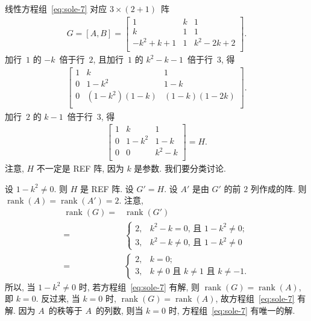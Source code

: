 \documentclass[../libro.tex]{subfiles}
\begin{document}
\begin{example}
    线性方程组~\eqref{eq:sole-7}
    对应 \(3 \times (2 + 1)\)~阵
    \begin{align*}
        G = [A, B] =
        \begin{bmatrix}
            1        & k & 1        \\
            k        & 1 & 1        \\
            -k^2+k+1 & 1 & k^2-2k+2 \\
        \end{bmatrix}.
    \end{align*}
    加行~\(1\) 的 \(-k\)~倍于行~\(2\),
    且加行~\(1\) 的 \(k^2 - k - 1\)~倍于行~\(3\),
    得
    \begin{align*}
        \begin{bmatrix}
            1 & k            & 1           \\
            0 & 1-k^2        & 1-k         \\
            0 & (1-k^2)(1-k) & (1-k)(1-2k) \\
        \end{bmatrix}.
    \end{align*}
    加行~\(2\) 的 \(k-1\)~倍于行~\(3\),
    得
    \begin{align*}
        \begin{bmatrix}
            1 & k     & 1     \\
            0 & 1-k^2 & 1-k   \\
            0 & 0     & k^2-k \\
        \end{bmatrix}
        = H.
    \end{align*}
    注意, \(H\) 不一定是 REF 阵,
    因为 \(k\) 是参数.
    我们要分类讨论.

    设 \(1 - k^2 \neq 0\).
    则 \(H\) 是 REF 阵.
    设 \(G' = H\).
    设 \(A'\) 是由 \(G'\) 的前 \(2\) 列作成的阵.
    则 \(\operatorname{rank} {(A)}
    = \operatorname{rank} {(A')} = 2\).
    注意,
    \begin{align*}
        \operatorname{rank} {(G)}
        = {} &
        \operatorname{rank} {(G')}
        \\
        = {} &
        \begin{cases}
            2, & \text{\(k^2-k = 0\), 且 \(1-k^2 \neq 0\)};   \\
            3, & \text{\(k^2-k \neq 0\), 且 \(1-k^2 \neq 0\)}
        \end{cases}
        \\
        = {} &
        \begin{cases}
            2, & k = 0;                                              \\
            3, & \text{\(k \neq 0\) 且 \(k \neq 1\) 且 \(k \neq -1\)}.
        \end{cases}
    \end{align*}
    所以, 当 \(1 - k^2 \neq 0\) 时,
    若方程组~\eqref{eq:sole-7} 有解, 则
    \(\operatorname{rank} {(G)} = \operatorname{rank} {(A)}\),
    即 \(k = 0\).
    反过来, 当 \(k = 0\) 时,
    \(\operatorname{rank} {(G)} = \operatorname{rank} {(A)}\),
    故方程组~\eqref{eq:sole-7} 有解.
    因为 \(A\)~的秩等于 \(A\)~的列数,
    则当 \(k = 0\) 时,
    方程组~\eqref{eq:sole-7} 有唯一的解.


\end{example}
\end{document}
